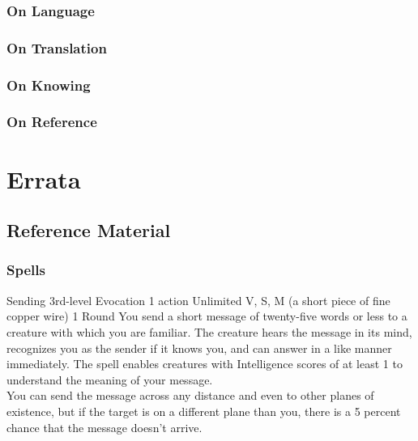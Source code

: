 \documentclass[10pt,twoside,twocolumn,openany,nomultitoc]{book}
\begin{document}
\begin{DndReadAloud}
  \lipsum[1]
\end{DndReadAloud}


\section{On Language}

\section{On Translation}
    \lipsum[1]
\section{On Knowing}
    \lipsum[2]
\section{On Reference}
    \lipsum[3]
    
\part{Errata}
\chapter{Reference Material}

\section{Spells}\vspace{6pt}

    \DndSpellHeader%
      {Sending}
      {3rd-level Evocation}
      {1 action}
      {Unlimited}
      {V, S, M (a short piece of fine copper wire)}
      {1 Round}
            You send a short message of twenty-five words or less to a creature with which you are familiar. The creature hears the message in its mind, recognizes you as the sender if it knows you, and can answer in a like manner immediately. The spell enables creatures with Intelligence scores of at least 1 to understand the meaning of your message. \\
            You can send the message across any distance and even to other planes of existence, but if the target is on a different plane than you, there is a 5 percent chance that the message doesn't arrive.
        
\end{document}

